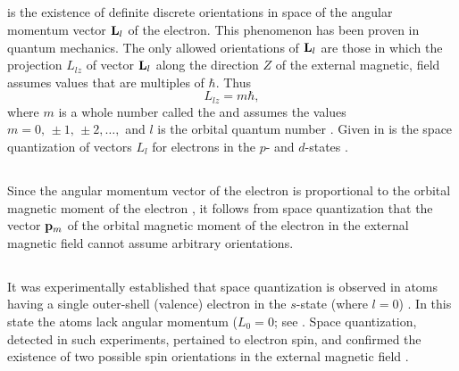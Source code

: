 \subsection{}\label{39.2.1}  is the existence of definite discrete orientations in space of the angular momentum vector $\vb{L}_{l}$ of the electron. This phenomenon has been proven in quantum mechanics. The only allowed orientations of $\vb{L}_{l}$ are those in which
the projection ${L}_{lz}$ of vector $\vb{L}_{l}$ along the direction $Z$ of the external magnetic, field assumes values that are multiples of $\hbar$.
Thus
\begin{equation*}%
L_{lz}= m \hbar,
\end{equation*}
where $m$ is a whole number called the  and assumes the values $m = 0, \, \pm 1, \, \pm 2, \ldots{},$ and $l$ is the orbital quantum number . Given in  is the space quantization of vectors $L_{l}$ for electrons in the $p$- and $d$-states .


\subsection{}\label{39.2.2} Since the angular momentum vector of the electron is proportional to the orbital magnetic moment of the electron , it follows from space quantization that the vector $\vb{p}_{m}$ of the orbital magnetic moment of the electron  in the external magnetic field cannot assume arbitrary orientations.

\subsection{}\label{39.2.3} It was experimentally established that space quantization is observed in atoms having a single outer-shell (valence) electron in the $s$-state (where $l = 0$) . In this state the atoms lack angular momentum ($L_{0} = 0$; see . Space quantization,
detected in such experiments, pertained to electron spin, and confirmed the existence of two possible spin orientations in the external magnetic field .

